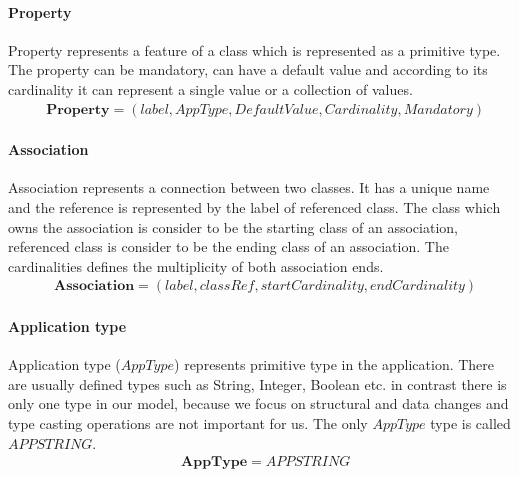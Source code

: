 \documentclass[11pt]{article}
\begin{document}
\paragraph{Property} Property represents a feature of a class which is represented as a primitive type. The property can be mandatory, can have a default value and according to its cardinality it can represent a single value or a collection of values. 
\begin{align*}
&	\mathbf{Property} = (label, AppType, DefaultValue, Cardinality, Mandatory)
\end{align*}

\paragraph {Association} Association represents a connection between two classes. It has a unique name and the reference is represented by the label of referenced class. The class which owns the association is consider to be the starting class of an association, referenced class is consider to be the ending class of an association. The cardinalities defines the multiplicity of both association ends.
\begin{align*}
&	\mathbf{Association} = (label, classRef, startCardinality, endCardinality) 
\end{align*}

\paragraph{Application type} Application type ($AppType$) represents primitive type in the application. There are usually defined types such as String, Integer, Boolean etc. in contrast there is only one type in our model, because we focus on structural and data changes and type casting operations are not important for us. The only $AppType$ type is called $APPSTRING$.
\begin{align*}
& \mathbf{AppType} = APPSTRING
\end{align*}

\end{document}
